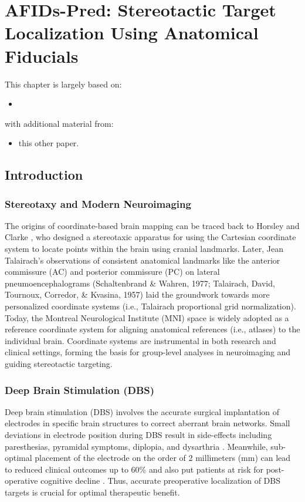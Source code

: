 \chapter{AFIDs-Pred: Stereotactic Target Localization Using Anatomical Fiducials}\label{chap:afidspred}
\newpage
\sloppy
This chapter is largely based on:
\begin{itemize}[noitemsep,topsep=0pt]
	\item \cite{taha2023}
\end{itemize}
with additional material from:
\begin{itemize}[noitemsep,topsep=0pt]
	\item this other paper.
\end{itemize}

\section{Introduction}

\subsection{Stereotaxy and Modern Neuroimaging}
The origins of coordinate-based brain mapping can be traced back to Horsley and Clarke \cite{ref}, who designed a stereotaxic apparatus for using the Cartesian coordinate system to locate points within the brain using cranial landmarks. Later, Jean Talairach’s observations of consistent anatomical landmarks like the anterior commissure (AC) and posterior commissure (PC) on lateral pneumoencephalograms (Schaltenbrand \& Wahren, 1977; Talairach, David, Tournoux, Corredor, \& Kvasina, 1957) laid the groundwork towards more personalized coordinate systems (i.e., Talairach proportional grid normalization). Today, the Montreal Neurological Institute (MNI) space \cite{ref} is widely adopted as a reference coordinate system for aligning anatomical references (i.e., atlases) to the individual brain. Coordinate systems are instrumental in both research and clinical settings, forming the basis for group-level analyses in neuroimaging and guiding stereotactic targeting.
\subsection{Deep Brain Stimulation (DBS)}
Deep brain stimulation (DBS) involves the accurate surgical implantation of electrodes in specific brain structures to correct aberrant brain networks. Small deviations in electrode position during DBS result in side-effects including paresthesias, pyramidal symptoms, diplopia, and dysarthria \cite{ref}. Meanwhile, sub-optimal placement of the electrode on the order of 2 millimeters (mm) can lead to reduced clinical outcomes up to 60\% \cite{ref} and also put patients at risk for post-operative cognitive decline \cite{ref}. Thus, accurate preoperative localization of DBS targets is crucial for optimal therapeutic benefit.
